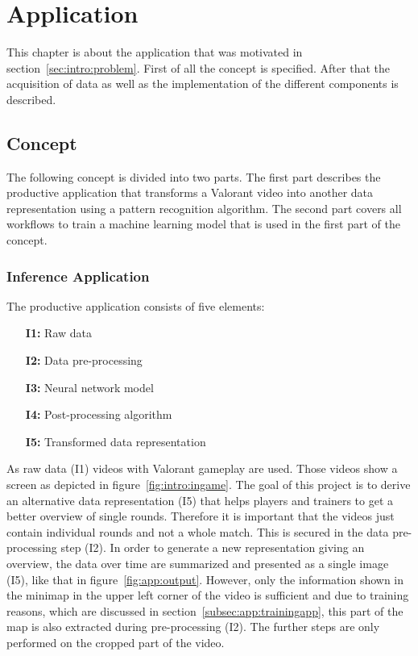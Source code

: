 \chapter{Application}\label{chpt:application}
\glsresetall

This chapter is about the application that was motivated in section~\ref{sec:intro:problem}. First of 
all the concept is specified. After that the acquisition of data as well as the implementation of the 
different components is described.

\section{Concept}\label{sec:app:concept}

The following concept is divided into two parts. The first part describes the productive application 
that transforms a Valorant video into another data representation using a pattern recognition 
algorithm. The second part covers all workflows to train a machine learning model that is used in the 
first part of the concept.

\subsection{Inference Application}\label{subsec:app:inferenceapp}

The productive application consists of five elements:

\begin{itemize}
	\item[\textbf{I1:}] Raw data
	\item[\textbf{I2:}] Data pre-processing
	\item[\textbf{I3:}] Neural network model
	\item[\textbf{I4:}] Post-processing algorithm
	\item[\textbf{I5:}] Transformed data representation
\end{itemize}

As raw data (I1) videos with Valorant gameplay are used. Those videos show a screen as depicted in 
figure~\ref{fig:intro:ingame}. The goal of this project is to derive an alternative data 
representation (I5) that helps players and trainers to get a better overview of single rounds. 
Therefore it is important that the videos just contain individual rounds and not a whole match. This is 
secured in the data pre-processing step (I2). In order to generate a new representation giving an 
overview, the data over time are summarized and presented as a single image (I5), like that in 
figure~\ref{fig:app:output}. However, only the information shown in the minimap in the upper left 
corner of the video is sufficient and due to training reasons, which are discussed in 
section~\ref{subsec:app:trainingapp}, this part of the map is also extracted during pre-processing 
(I2). The further steps are only performed on the cropped part of the video.

